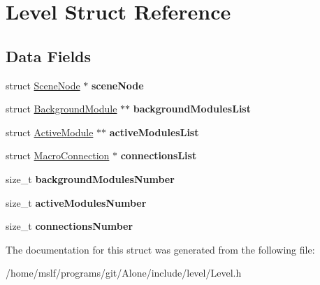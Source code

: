 \hypertarget{struct_level}{}\section{Level Struct Reference}
\label{struct_level}
\subsection*{Data Fields}
\begin{DoxyCompactItemize}
\item 
\hypertarget{struct_level_a423738fbe912b45f31f4d80af3aa244a}{}\label{struct_level_a423738fbe912b45f31f4d80af3aa244a} 
struct \hyperlink{struct_scene_node}{Scene\+Node} $\ast$ {\bfseries scene\+Node}
\item 
\hypertarget{struct_level_a4591cd1e32070b046cf1c44d018f828f}{}\label{struct_level_a4591cd1e32070b046cf1c44d018f828f} 
struct \hyperlink{struct_background_module}{Background\+Module} $\ast$$\ast$ {\bfseries background\+Modules\+List}
\item 
\hypertarget{struct_level_a1e6247e011e52d3b0897bbfb3dc18d94}{}\label{struct_level_a1e6247e011e52d3b0897bbfb3dc18d94} 
struct \hyperlink{struct_active_module}{Active\+Module} $\ast$$\ast$ {\bfseries active\+Modules\+List}
\item 
\hypertarget{struct_level_aeeaa868210d615b28c642d00537c2416}{}\label{struct_level_aeeaa868210d615b28c642d00537c2416} 
struct \hyperlink{struct_macro_connection}{Macro\+Connection} $\ast$ {\bfseries connections\+List}
\item 
\hypertarget{struct_level_a03a62cbf5839395bbe96e4285d8e5ecb}{}\label{struct_level_a03a62cbf5839395bbe96e4285d8e5ecb} 
size\+\_\+t {\bfseries background\+Modules\+Number}
\item 
\hypertarget{struct_level_a5e35b64f3662f78597c212c97f5a169d}{}\label{struct_level_a5e35b64f3662f78597c212c97f5a169d} 
size\+\_\+t {\bfseries active\+Modules\+Number}
\item 
\hypertarget{struct_level_a0fada452902e3dc14c786de8d1cb5ed5}{}\label{struct_level_a0fada452902e3dc14c786de8d1cb5ed5} 
size\+\_\+t {\bfseries connections\+Number}
\end{DoxyCompactItemize}


The documentation for this struct was generated from the following file\+:\begin{DoxyCompactItemize}
\item 
/home/mslf/programs/git/\+Alone/include/level/Level.\+h\end{DoxyCompactItemize}
